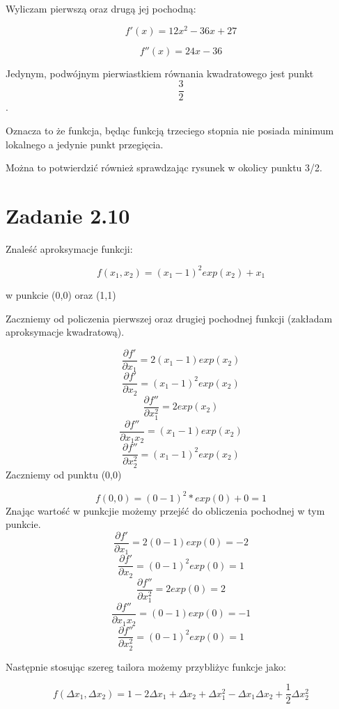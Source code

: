 \documentclass[paper=a4, fontsize=11pt]{scrartcl} %
\begin{document}
Wyliczam pierwszą oraz drugą jej pochodną:

\[f'(x)=12x^2-36x+27\]

\[f''(x)=24x-36\]

Jedynym, podwójnym pierwiastkiem równania kwadratowego jest punkt \[ \frac{3}{2}\].

Oznacza to że funkcja, będąc funkcją trzeciego stopnia nie posiada minimum lokalnego a jedynie punkt przegięcia.

Można to potwierdzić również sprawdzając rysunek w okolicy punktu 3/2.


\newpage



\section{Zadanie 2.10}

Znaleść aproksymacje funkcji:

\[f(x_1,x_2) = (x_1-1)^2exp(x_2)+x_1\]

w punkcie (0,0) oraz (1,1)

Zaczniemy od policzenia pierwszej oraz drugiej pochodnej funkcji (zakładam aproksymacje kwadratową).

\[\frac{\partial f'}{\partial x_1} = 2(x_1-1)exp(x_2)\]
\[\frac{\partial f'}{\partial x_2} = (x_1-1)^2exp(x_2)\]
\[\frac{\partial f''}{\partial x_1^2} = 2exp(x_2)\]
\[\frac{\partial f''}{\partial x_1x_2} = (x_1-1)exp(x_2)\]
\[\frac{\partial f''}{\partial x_2^2} = (x_1-1)^2exp(x_2)\]
Zaczniemy od punktu (0,0)

\[f(0,0) = (0-1)^2*exp(0)+0=1\]
Znając wartość w punkcjie możemy przejść do obliczenia pochodnej w tym punkcie.
\[\frac{\partial f'}{\partial x_1} = 2(0-1)exp(0)=-2\]
\[\frac{\partial f'}{\partial x_2} = (0-1)^2exp(0)=1\]
\[\frac{\partial f''}{\partial x_1^2} = 2exp(0)=2\]
\[\frac{\partial f''}{\partial x_1x_2} = (0-1)exp(0)=-1\]
\[\frac{\partial f''}{\partial x_2^2} = (0-1)^2exp(0)=1\]

Następnie stosując szereg tailora możemy przybliżyc funkcje jako:

\[f(\Delta x_1,\Delta x_2)=1-2\Delta x_1+\Delta x_2+\Delta x_1^2-\Delta x_1\Delta x_2+\frac{1}{2}\Delta x_2^2\]
\end{document}
